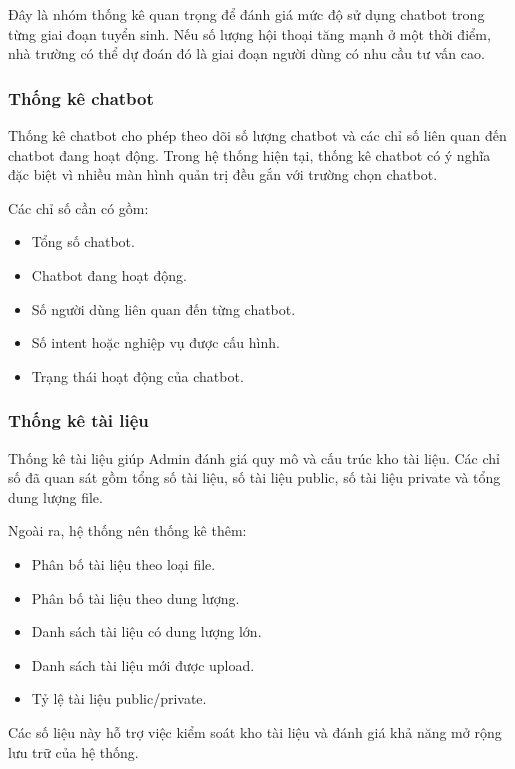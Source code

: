 Đây là nhóm thống kê quan trọng để đánh giá mức độ sử dụng chatbot trong từng giai đoạn tuyển sinh. Nếu số lượng hội thoại tăng mạnh ở một thời điểm, nhà trường có thể dự đoán đó là giai đoạn người dùng có nhu cầu tư vấn cao.

\subsubsection{Thống kê chatbot}

Thống kê chatbot cho phép theo dõi số lượng chatbot và các chỉ số liên quan đến chatbot đang hoạt động. Trong hệ thống hiện tại, thống kê chatbot có ý nghĩa đặc biệt vì nhiều màn hình quản trị đều gắn với trường chọn chatbot.

Các chỉ số cần có gồm:

\begin{itemize}
    \item Tổng số chatbot.
    \item Chatbot đang hoạt động.
    \item Số người dùng liên quan đến từng chatbot.
    \item Số intent hoặc nghiệp vụ được cấu hình.
    \item Trạng thái hoạt động của chatbot.
\end{itemize}

\subsubsection{Thống kê tài liệu}

Thống kê tài liệu giúp Admin đánh giá quy mô và cấu trúc kho tài liệu. Các chỉ số đã quan sát gồm tổng số tài liệu, số tài liệu public, số tài liệu private và tổng dung lượng file.

Ngoài ra, hệ thống nên thống kê thêm:

\begin{itemize}
    \item Phân bố tài liệu theo loại file.
    \item Phân bố tài liệu theo dung lượng.
    \item Danh sách tài liệu có dung lượng lớn.
    \item Danh sách tài liệu mới được upload.
    \item Tỷ lệ tài liệu public/private.
\end{itemize}

Các số liệu này hỗ trợ việc kiểm soát kho tài liệu và đánh giá khả năng mở rộng lưu trữ của hệ thống.

